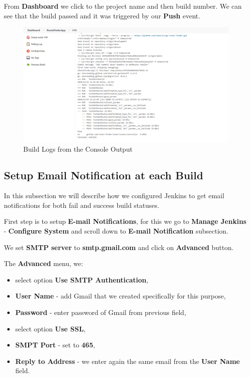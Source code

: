 \documentclass[12pt,a4paper,twoside]{article}
\begin{document}
From \textbf{Dashboard} we click to the project name and then build number. We can see that the build passed and it was triggered by our \textbf{Push} event.

\begin{figure}[H]
    \centering
        \includegraphics[width=15cm]{images-aws/50-triggered-push-logs.png}
        \caption{Build Logs from the Console Output}
\end{figure}





\subsection{Setup Email Notification at each Build}


In this subsection we will describe how we configured Jenkins to get email notifications for both fail and success build statuses.


First step is to setup \textbf{E-mail Notifications}, for this we go to \textbf{Manage Jenkins} - \textbf{Configure System} and scroll down to \textbf{E-mail Notification} subsection.


We set \textbf{SMTP server} to \textbf{smtp.gmail.com} and click on \textbf{Advanced} button.


The \textbf{Advanced} menu, we:


\begin{itemize}
	\item  select option \textbf{Use SMTP Authentication},
	\item \textbf{User Name} - add Gmail that we created specifically for this purpose,
	\item \textbf{Password} - enter password of Gmail from previous field,
	\item  select option \textbf{Use SSL},
	\item \textbf{SMPT Port} - set to \textbf{465},
	\item \textbf{Reply to Address} - we enter again the same email from the \textbf{User Name} field.
\end{itemize}
\end{document}
